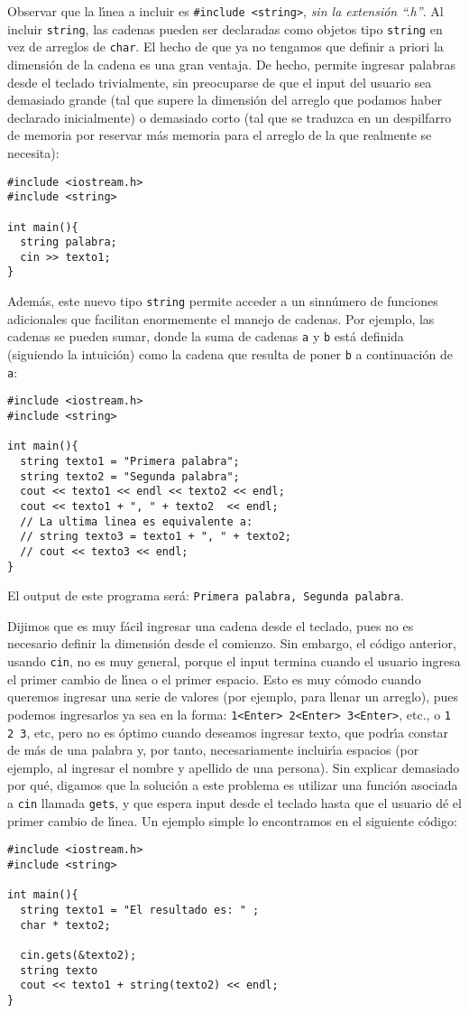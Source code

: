 Observar que la l\'{\i}nea a incluir es \verb+#include <string>+,
{\em sin la extensi\'on ``.h''}. Al incluir \verb+string+, las cadenas
pueden ser declaradas como objetos tipo \verb+string+ en vez de
arreglos de \verb+char+. El hecho de que ya no tengamos que definir a
priori la dimensi\'on de la cadena es una gran ventaja. De hecho,
permite ingresar palabras desde el teclado trivialmente, sin
preocuparse de que el input del usuario sea demasiado grande (tal que
supere la dimensi\'on del arreglo que podamos haber declarado
inicialmente) o
demasiado corto (tal que se traduzca en un despilfarro de memoria por
reservar m\'as memoria para el arreglo de la que realmente se necesita):
\begin{verbatim}
#include <iostream.h>
#include <string>

int main(){
  string palabra;
  cin >> texto1;
}
\end{verbatim}

Adem\'as, este nuevo tipo \verb+string+ permite
acceder a un sinn\'umero de funciones adicionales que facilitan
enormemente el manejo de cadenas. Por ejemplo, las cadenas se pueden
sumar, donde la suma de cadenas \verb+a+ y \verb+b+ 
est\'a definida (siguiendo la
intuici\'on) como la cadena que resulta de poner \verb+b+ a
continuaci\'on de \verb+a+:
\begin{verbatim}
#include <iostream.h>
#include <string>

int main(){
  string texto1 = "Primera palabra";
  string texto2 = "Segunda palabra";
  cout << texto1 << endl << texto2 << endl;
  cout << texto1 + ", " + texto2  << endl;
  // La ultima linea es equivalente a:
  // string texto3 = texto1 + ", " + texto2;
  // cout << texto3 << endl;
}
\end{verbatim}
El output de este programa ser\'a:
\verb+Primera palabra, Segunda palabra+. 

Dijimos que es muy f\'acil ingresar una cadena desde el teclado, pues
no es necesario definir la dimensi\'on desde el comienzo. Sin embargo,
el c\'odigo anterior, usando \verb+cin+, no es muy general, porque el
input termina cuando el usuario ingresa el primer cambio de l\'{\i}nea
o el primer espacio. Esto es muy c\'omodo cuando queremos ingresar una
serie de valores (por ejemplo, para llenar un arreglo), 
pues podemos ingresarlos ya sea en la forma: 
\verb+1<Enter> 2<Enter> 3<Enter>+, etc., o \verb+1 2 3+, etc, pero no
es \'optimo cuando deseamos ingresar texto, que podr\'{\i}a constar de
m\'as de una palabra y, por tanto, necesariamente incluir\'{\i}a
espacios (por ejemplo, al ingresar el nombre y apellido de una
persona). Sin explicar demasiado por qu\'e, digamos que la soluci\'on
a este problema es utilizar una funci\'on asociada a \verb+cin+
llamada \verb+gets+, y que espera input desde el teclado hasta que el
usuario d\'e el primer cambio de l\'{\i}nea. Un ejemplo simple lo
encontramos en el siguiente c\'odigo:
\begin{verbatim}
#include <iostream.h>
#include <string>

int main(){
  string texto1 = "El resultado es: " ;
  char * texto2;

  cin.gets(&texto2);
  string texto
  cout << texto1 + string(texto2) << endl;
}
\end{verbatim}

